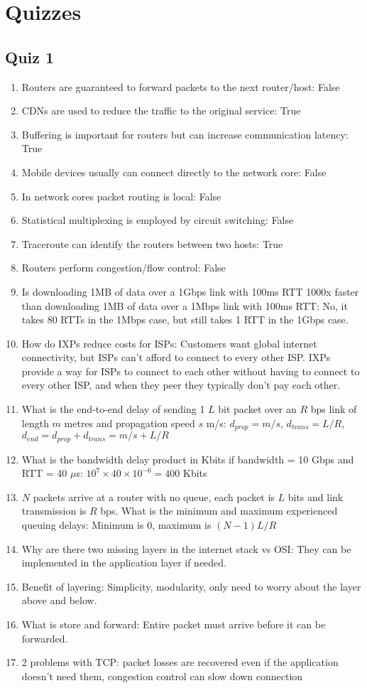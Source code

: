 \section{Quizzes}
\subsection{Quiz 1}
\begin{enumerate}
	\itemsep-0.5em
	\item Routers are guaranteed to forward packets to the next router/host: False
	\item CDNs are used to reduce the traffic to the original service: True
	\item Buffering is important for routers but can increase communication latency: True
	\item Mobile devices usually can connect directly to the network core: False
	\item In network cores packet routing is local: False
	\item Statistical multiplexing is employed by circuit switching: False
	\item Traceroute can identify the routers between two hosts: True
	\item Routers perform congestion/flow control: False
	\item Is downloading 1MB of data over a 1Gbps link with 100ms RTT 1000x faster than downloading 1MB of data over a 1Mbps link with 100ms RTT: No, it takes 80 RTTs in the 1Mbps case, but still takes 1 RTT in the 1Gbps case.
	\item How do IXPs reduce costs for ISPs: Customers want global internet connectivity, but ISPs can't afford to connect to every other ISP. IXPs provide a way for ISPs to connect to each other without having to connect to every other ISP, and when they peer they typically don't pay each other.
	\item What is the end-to-end delay of sending 1 $L$ bit packet over an $R$ bps link of length $m$ metres and propagation speed $s$ m/s: $d_{prop}=m/s$, $d_{trans}=L/R$, $d_{end}=d_{prop}+d_{trans}=m/s+L/R$
	\item What is the bandwidth delay product in Kbits if bandwidth = 10 Gbps and RTT = 40 $\mu$s: $10^7 \times 40 \times 10^{-6} = 400$ Kbits
	\item $N$ packets arrive at a router with no queue, each packet is $L$ bits and link transmission is $R$ bps. What is the minimum and maximum experienced queuing delays: Minimum is 0, maximum is $(N-1)L/R$
	\item Why are there two missing layers in the internet stack vs OSI: They can be implemented in the application layer if needed.
	\item Benefit of layering: Simplicity, modularity, only need to worry about the layer above and below.
	\item What is store and forward: Entire packet must arrive before it can be forwarded.
	\item 2 problems with TCP: packet losses are recovered even if the application doesn't need them, congestion control can slow down connection
\end{enumerate}

